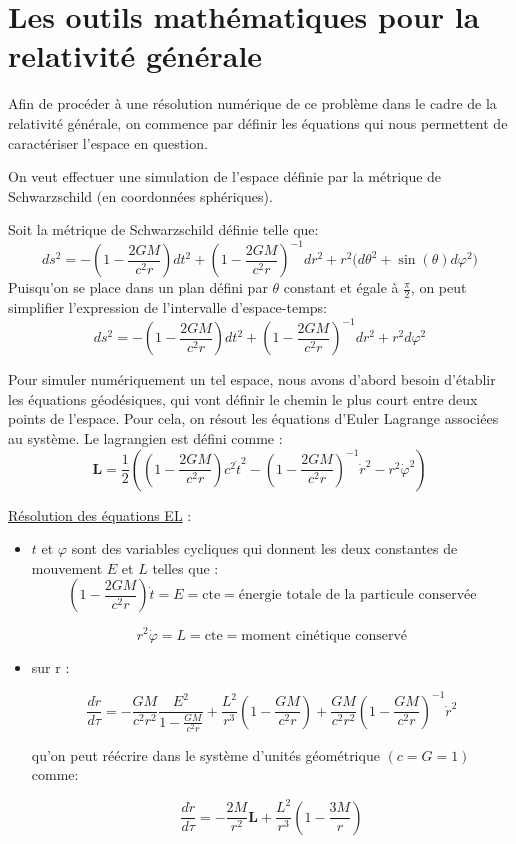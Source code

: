 \documentclass{article}
\begin{document}
\section{Les outils mathématiques pour la relativité générale}

Afin de procéder à une résolution numérique de ce problème dans le cadre de la relativité générale, on commence par définir les équations qui nous permettent de caractériser l’espace en question.\\ \vspace{-1em}

On veut effectuer une simulation de l’espace définie par la métrique de Schwarzschild (en coordonnées sphériques). \\ \vspace{-1em}

Soit la métrique de Schwarzschild définie telle que:
\[ ds^2 = -\left(1-\frac{2GM}{c^2r}\right)dt^2+\left(1-\frac{2GM}{c^2r}\right)^{-1}dr^2+r^2\big(d\theta ^2 +\sin(\theta)d\varphi^2\big)\]
Puisqu’on se place dans un plan défini par $\theta$ constant et égale à $\frac{\pi}{2}$, on peut simplifier l’expression de l'intervalle d'espace-temps:
\[ ds^2 = -\left(1-\frac{2GM}{c^2r}\right)dt^2+\left(1-\frac{2GM}{c^2r}\right)^{-1}dr^2+r^2d\varphi^2\]

Pour simuler numériquement un tel espace, nous avons d’abord besoin d'établir les équations géodésiques, qui vont définir le chemin le plus court entre deux points de l’espace. Pour cela, on résout les équations d’Euler Lagrange associées au système. Le lagrangien est défini comme : 
\[\mathbf L=\frac{1}{2}\left(\left(1-\frac{2GM}{c^2r}\right)c^2\dot t^2-\left(1-\frac{2GM}{c^2r}\right)^{-1}\dot r^2 - r^2\dot \varphi^2\right)\]

\newpage

\underline{Résolution des équations EL} :
\begin{itemize}[label=\textendash]
    \item $t$ et $\varphi$ sont des variables cycliques qui donnent les deux constantes de mouvement $E$ et $L$ telles que : 
    \begin{equation}\label{eq:1}\left(1-\frac{2GM}{c^2r}\right)\dot t = E = \text{cte}=\text{énergie totale de la particule conservée}\end{equation}\vspace{-2em}

    \begin{equation}\label{eq:2}r^2\dot \varphi = L = \text{cte}=\text{moment cinétique conservé}\end{equation}
    \item sur r : 

    \[\frac{d\dot r}{d\tau}=-\frac{GM}{c^2r^2}\frac{E^2}{1-\frac{GM}{c^2r}}+\frac{L^2}{r^3}\left(1-\frac{GM}{c^2r}\right)+\frac{GM}{c^2r^2}\left(1-\frac{GM}{c^2r}\right)^{-1}\dot r^2\]
      
    qu'on peut réécrire dans le système d'unités géométrique $(c=G=1)$ comme: 
    
    \[\frac{d\dot r}{d\tau}=-\frac{2M}{r^2}\mathbf{L}+\frac{L^2}{r^3}\left(1-\frac{3M}{r}\right)\]
\end{itemize}
\end{document}
